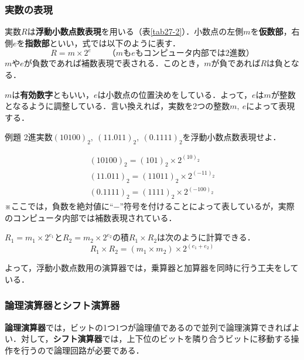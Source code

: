 \subsubsection{実数の表現}

実数$R$は\textbf{浮動小数点数表現}を用いる（表\ref{tab27-2}）．小数点の左側$m$を\textbf{仮数部}，右側$e$を\textbf{指数部}といい，式では以下のように表す．
\begin{equation}
	R = m \times 2^e \qquad \text{（$m$も$e$もコンピュータ内部では2進数）}
\end{equation}
$m$や$e$が負数であれば補数表現で表される．このとき，$m$が負であれば$R$は負となる．

$m$は\textbf{有効数字}ともいい，$e$は小数点の位置決めをしている．よって，$e$は$m$が整数となるように調整している．言い換えれば，実数を2つの整数$m,\ e$によって表現する．

\begin{tip}{例題}
	\textsf{
		2進実数$(10100)_{2},\ (11.011)_{2},\ (0.1111)_{2}$を浮動小数点数表現せよ．
	}
	
	\tcblower

	\begin{gather*}
		(10100)_{2} = (101)_{2} \times 2^{(10)_{2}}\\
		(11.011)_{2} = (11011)_{2} \times 2^{(-11)_{2}}\\
		(0.1111)_{2} = (1111)_{2} \times 2^{(-100)_{2}}
	\end{gather*}
	※ここでは，負数を絶対値に“$-$”符号を付けることによって表しているが，実際のコンピュータ内部では補数表現されている．
\end{tip}

$R_1 = m_1 \times 2^{e_1}$と$R_2 = m_2 \times 2^{e_2}$の積$R_1 \times R_2$は次のように計算できる．
\begin{equation}
	R_1 \times R_2 = (m_1 \times m_2) \times 2^{(e_1 + e_2)}
\end{equation}

よって，浮動小数点数用の演算器では，乗算器と加算器を同時に行う工夫をしている．



\subsubsection{論理演算器とシフト演算器}

\textbf{論理演算器}では，ビットの1つ1つが論理値であるので並列で論理演算できればよい．対して，\textbf{シフト演算器}では，上下位のビットを隣り合うビットに移動する操作を行うので論理回路が必要である．



